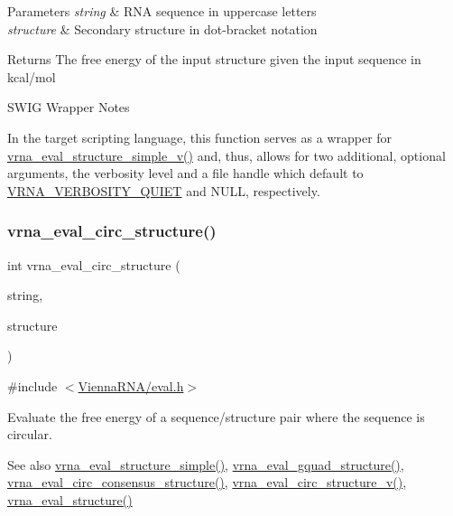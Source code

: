 \begin{DoxyParams}{Parameters}
{\em string} & R\+NA sequence in uppercase letters \\
\hline
{\em structure} & Secondary structure in dot-\/bracket notation \\
\hline
\end{DoxyParams}
\begin{DoxyReturn}{Returns}
The free energy of the input structure given the input sequence in kcal/mol
\end{DoxyReturn}
\begin{DoxyRefDesc}{S\+W\+I\+G Wrapper Notes}
\item[\mbox{\hyperlink{wrappers__wrappers000053}{S\+W\+I\+G Wrapper Notes}}]In the target scripting language, this function serves as a wrapper for \mbox{\hyperlink{group__eval_gacd6278343e77d13f1d53588e50d303bc}{vrna\+\_\+eval\+\_\+structure\+\_\+simple\+\_\+v()}} and, thus, allows for two additional, optional arguments, the verbosity level and a file handle which default to \mbox{\hyperlink{group__eval_gaf4afe19780b61b4962c613bde324128b}{V\+R\+N\+A\+\_\+\+V\+E\+R\+B\+O\+S\+I\+T\+Y\+\_\+\+Q\+U\+I\+ET}} and N\+U\+LL, respectively. \end{DoxyRefDesc}
\mbox{\label{group__eval_ga3e05a23ddf9b083f4e69881e440d4866}} 
\subsubsection{\texorpdfstring{vrna\_eval\_circ\_structure()}{vrna\_eval\_circ\_structure()}}
{\footnotesize\ttfamily int vrna\+\_\+eval\+\_\+circ\+\_\+structure (\begin{DoxyParamCaption}\item[{const char $\ast$}]{string,  }\item[{const char $\ast$}]{structure }\end{DoxyParamCaption})}



{\ttfamily \#include $<$\mbox{\hyperlink{eval_8h}{Vienna\+R\+N\+A/eval.\+h}}$>$}



Evaluate the free energy of a sequence/structure pair where the sequence is circular. 

\begin{DoxySeeAlso}{See also}
\mbox{\hyperlink{group__eval_ga7e5273464b775d4130245681312c1369}{vrna\+\_\+eval\+\_\+structure\+\_\+simple()}}, \mbox{\hyperlink{group__eval_ga3263504825ef4b523eba797c99921df4}{vrna\+\_\+eval\+\_\+gquad\+\_\+structure()}}, \mbox{\hyperlink{group__eval_gac96577cf232c71160f762737a994b7c6}{vrna\+\_\+eval\+\_\+circ\+\_\+consensus\+\_\+structure()}}, \mbox{\hyperlink{group__eval_gac3fb44e0773a51be8efc5f4f595a94a7}{vrna\+\_\+eval\+\_\+circ\+\_\+structure\+\_\+v()}}, \mbox{\hyperlink{group__eval_ga58f199f1438d794a265f3b27fc8ea631}{vrna\+\_\+eval\+\_\+structure()}}
\end{DoxySeeAlso}

